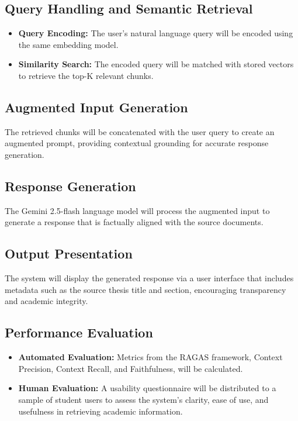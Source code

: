 \begin{refsection}
\subsection*{Query Handling and Semantic Retrieval}
\begin{itemize}
    \item \textbf{Query Encoding:} The user’s natural language query will be encoded using the same embedding model.
    \item \textbf{Similarity Search:} The encoded query will be matched with stored vectors to retrieve the top-K relevant chunks.
\end{itemize}

\subsection*{Augmented Input Generation}
The retrieved chunks will be concatenated with the user query to create an augmented prompt, providing contextual grounding for accurate response generation.

\subsection*{Response Generation}
The Gemini 2.5-flash language model will process the augmented input to generate a response that is factually aligned with the source documents.

\subsection*{Output Presentation}
The system will display the generated response via a user interface that includes metadata such as the source thesis title and section, encouraging transparency and academic integrity.

\subsection*{Performance Evaluation}
\begin{itemize}
    \item \textbf{Automated Evaluation:} Metrics from the RAGAS framework, Context Precision, Context Recall, and Faithfulness, will be calculated.
    \item \textbf{Human Evaluation:} A usability questionnaire will be distributed to a sample of student users to assess the system’s clarity, ease of use, and usefulness in retrieving academic information.
\end{itemize}


\end{refsection}
